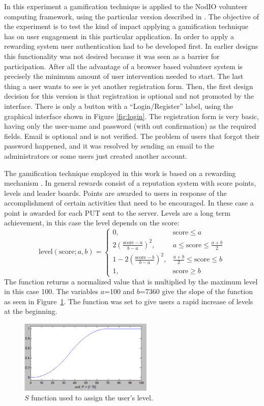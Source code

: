\documentclass{llncs}
\begin{document}
In this experiment a gamification technique is applied to 
the {\sf NodIO} volunteer computing framework, using the 
particular version described in \cite{DBLP:conf/gecco/MereloCGCRV16,2016arXiv160101607M}.
The objective of the experiment is to test the kind of impact 
applying a gamification technique has on user engagement in this
particular application. In order to apply a rewarding system
user authentication had to be developed first. In earlier designs
this functionality was not desired because it was seen as a barrier 
for participation. After all the advantage of a browser based volunteer system
is precisely the minimum amount of user intervention needed to start.
The last thing a user wants to see is yet another registration form.
Then, the first design decision for this version is that registration is optional
and not promoted by the interface. There is only a button with a ``Login/Register'' label,
using the graphical interface shown in Figure \ref{fig:login}. 
The registration form is very basic, having only the user-name and 
password (with out confirmation) as the required fields. Email is optional
and is not verified. The problem of users that forgot their password
happened, and it was resolved by sending an email to the administrators
or some users just created another account. 

The gamification technique employed in this work is based on a rewarding mechanism  
\cite{dubois2013understanding}. In general rewards  consist of a reputation system 
with score points, levels and leader boards. Points are awarded to users in response of 
the accomplishment of certain activities that need to be encouraged. In these case
a point is awarded for each PUT sent to the server. Levels are a long
term achievement, in this case the level depends on the score:
\[ \text{level}(\text{score};a,b)= 
    \begin{cases} 
      0,                                    &  \text{score}\leq a\\    
      2(\frac{\text{score}-a}{b-a})^{2},    &  a\leq \text{score}\leq \frac{a+b}{2}\\
      1-2(\frac{\text{score}-b}{b-a})^{2},  & \frac{a+b}{2} \leq \text{score}\leq b\\
      1,                                    & \text{score}\geq b 
   \end{cases}
\]
The function returns a normalized value that is multiplied by the maximum level 
in this case 100. The variables $a$=100 and $b$=7360 give the slope of the function as
seen in Figure~\ref{fig:s}. The function was set to give users a rapid increase of 
levels at the beginning.
\begin{figure}[htbp]
    \centering
        \includegraphics[width=2.5in]{img/s.png}
    \caption{$S$ function used to assign the user's level.
    }
    \label{fig:s}
\end{figure}
\end{document}

